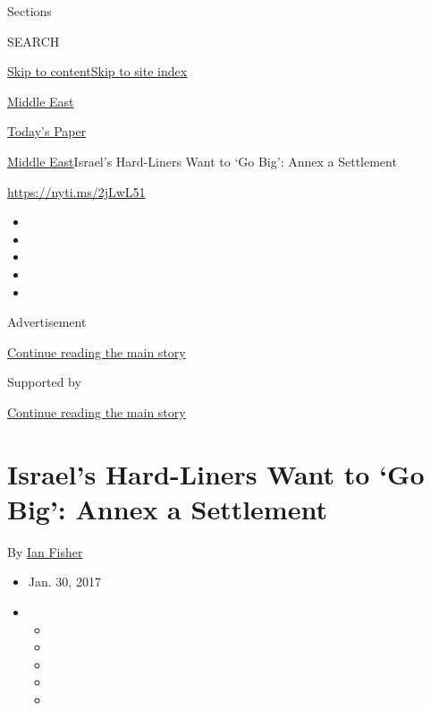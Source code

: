 Sections

SEARCH

\protect\hyperlink{site-content}{Skip to
content}\protect\hyperlink{site-index}{Skip to site index}

\href{https://www.nytimes3xbfgragh.onion/section/world/middleeast}{Middle
East}

\href{https://myaccount.nytimes3xbfgragh.onion/auth/login?response_type=cookie\&client_id=vi}{}

\href{https://www.nytimes3xbfgragh.onion/section/todayspaper}{Today's
Paper}

\href{/section/world/middleeast}{Middle East}\textbar{}Israel's
Hard-Liners Want to `Go Big': Annex a Settlement

\url{https://nyti.ms/2jLwL51}

\begin{itemize}
\item
\item
\item
\item
\item
\end{itemize}

Advertisement

\protect\hyperlink{after-top}{Continue reading the main story}

Supported by

\protect\hyperlink{after-sponsor}{Continue reading the main story}

\hypertarget{israels-hard-liners-want-to-go-big-annex-a-settlement}{%
\section{Israel's Hard-Liners Want to `Go Big': Annex a
Settlement}\label{israels-hard-liners-want-to-go-big-annex-a-settlement}}

By \href{http://www.nytimes3xbfgragh.onion/by/ian-fisher}{Ian Fisher}

\begin{itemize}
\item
  Jan. 30, 2017
\item
  \begin{itemize}
  \item
  \item
  \item
  \item
  \item
  \end{itemize}
\end{itemize}

